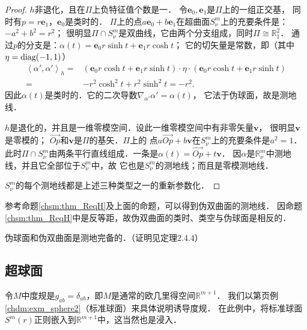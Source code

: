 \begin{proof}
     $h$非退化，且在$\Pi$上负特征值个数是一．
    令$\boldsymbol{e}_0,\boldsymbol{e}_1$是$\Pi$上的一组正交基，
    同时有$p=r\boldsymbol{e}_1$，$\boldsymbol{e}_0$是类时的．
    $\Pi$上的点$a\boldsymbol{e}_0+b\boldsymbol{e}_1$在超曲面$S^m_\nu$上的充要条件是：$-a^2+b^2=r^2$；
    很明显$\Pi \cap S^m_\nu$是双曲线，它由两个分支组成，同时$\Pi\cong \mathbb{R}^2_1$．
    通过$p$的分支是：$\alpha(t)= \boldsymbol{e}_0 r \sinh t +\boldsymbol{e}_1 r \cosh t $；
    它的切矢量是常数，即（其中$\eta={\rm diag}(-1,1)$）
    \begin{align*}
        \left<\alpha', \alpha'\right>_h
        =&\left( \boldsymbol{e}_0 r \cosh t +\boldsymbol{e}_1 r \sinh t \right) \cdot\eta\cdot
         \left( \boldsymbol{e}_0 r \cosh t +\boldsymbol{e}_1 r \sinh t \right) \\
        =&-r^2 \cosh^2t+ r^2 \sinh^2 t =-r^2 .
    \end{align*}
    因此$\alpha(t)$是类时的．它的二次导数$\nabla_{\alpha'}\alpha' =\alpha(t)$，
    它法于伪球面，故是测地线．
    
     $h$是退化的，并且是一维零模空间．设此一维零模空间中有非零矢量$\boldsymbol{v}$，
    很明显$\boldsymbol{v}$是零模的；
    $\overrightarrow{Op}$和$\boldsymbol{v}$是$\Pi$的基矢．$\Pi$上的
    点$a\overrightarrow{Op}+b\boldsymbol{v}$在$S^m_\nu$上的充要条件是$a^2=1$．
    此时$\Pi\cap S^m_\nu$由两条平行直线组成．一条是$\alpha(t)=\overrightarrow{Op}+t\boldsymbol{v}$．
    因$\alpha$是$\mathbb{R}^m_\nu$中测地线，并且它全部位于$S^m_\nu$中，故
    它也是$S^m_\nu$的测地线；而且是零模测地线．
    
    $S^m_\nu$的每个测地线都是上述三种类型之一的重新参数化．
\end{proof}

参考命题\ref{chsm:thm_ReqH}及上面的命题，可以得到伪双曲面的测地线．
因命题\ref{chsm:thm_ReqH}中是反等距，故伪双曲面的类时、类空与伪球面是相反的．


\begin{proposition}\label{chsm:thm_SH-complete}
    伪球面和伪双曲面是测地完备的．（证明见\parencite{wolf_SCC-2011}定理2.4.4）
\end{proposition}


\subsection{超球面}\label{chsm:sec_sphere}
令$M$中度规是$g_{ab}=\delta_{ab}$，即$M$是通常的欧几里得空间$\mathbb{R}^{m+1}$．
我们以第\pageref{chdm:exm_sphere2}页例\ref{chdm:exm_sphere2}（标准球面）来具体说明诱导度规．
在此例中，将标准球面$S^m(r)$正则嵌入到$\mathbb{R}^{m+1}$中，这当然也是浸入．

